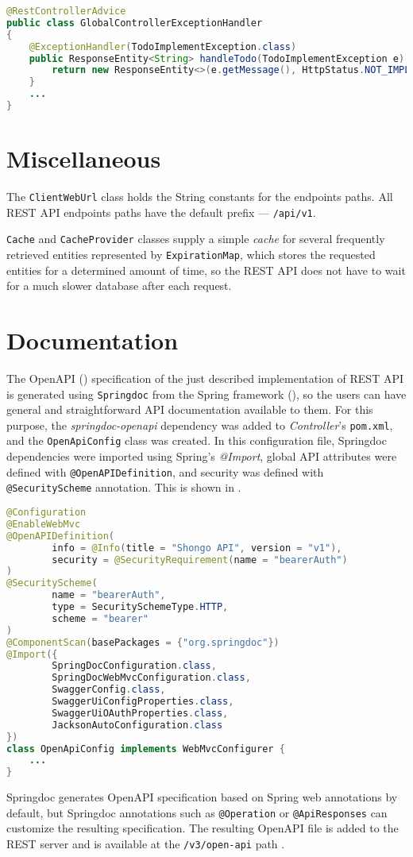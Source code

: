\begin{lstlisting}[language=java, caption=GlobalControllerExceptionHandler.java, label=lst:err]
@RestControllerAdvice
public class GlobalControllerExceptionHandler
{
    @ExceptionHandler(TodoImplementException.class)
    public ResponseEntity<String> handleTodo(TodoImplementException e) {
        return new ResponseEntity<>(e.getMessage(), HttpStatus.NOT_IMPLEMENTED);
    }
    ...
}
\end{lstlisting}


\section{Miscellaneous}
The \texttt{ClientWebUrl} class holds the String constants for the endpoints paths. All REST API endpoints paths have the default prefix --- \texttt{/api/v1}.

\texttt{Cache} and \texttt{CacheProvider} classes supply a simple \emph{cache} for several frequently retrieved entities represented by \texttt{ExpirationMap}, which stores the requested entities for a determined amount of time, so the REST API does not have to wait for a much slower database after each request.


\section{Documentation}
The OpenAPI () specification of the just described implementation of REST API is generated using \texttt{Springdoc} from the Spring framework (), so the users can have general and straightforward API documentation available to them.
For this purpose, the \emph{springdoc-openapi} dependency was added to \emph{Controller}'s \texttt{pom.xml}, and the \texttt{OpenApiConfig} class was created. In this configuration file, Springdoc dependencies were imported using Spring's \emph{@Import}, global API attributes were defined with \texttt{@OpenAPIDefinition}, and security was defined with \texttt{@SecurityScheme} annotation.
This is shown in .
\begin{lstlisting}[language=Java, caption=OpenApiConfig.java, label=lst:openapiconf]
@Configuration
@EnableWebMvc
@OpenAPIDefinition(
        info = @Info(title = "Shongo API", version = "v1"),
        security = @SecurityRequirement(name = "bearerAuth")
)
@SecurityScheme(
        name = "bearerAuth",
        type = SecuritySchemeType.HTTP,
        scheme = "bearer"
)
@ComponentScan(basePackages = {"org.springdoc"})
@Import({
        SpringDocConfiguration.class,
        SpringDocWebMvcConfiguration.class,
        SwaggerConfig.class,
        SwaggerUiConfigProperties.class,
        SwaggerUiOAuthProperties.class,
        JacksonAutoConfiguration.class
})
class OpenApiConfig implements WebMvcConfigurer {
    ...
}
\end{lstlisting}
Springdoc generates OpenAPI specification based on Spring web annotations by default, but Springdoc annotations such as \texttt{@Operation} or \texttt{@ApiResponses} can customize the resulting specification.
The resulting OpenAPI file is added to the REST server and is available at the \texttt{/v3/open-api} path \cite{springdoc}.

